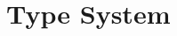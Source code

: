 \documentclass[preprint]{sigplanconf}
\makeatletter
\newcommand{\many}{\overline}
\newcommand\ba{\begin{array}}
\newcommand\ea{\end{array}}
\newcommand{\bstack}{\begin{array}[t]{@{}l@{}}}
\newcommand{\estack}{\end{array}}
\newenvironment{equations}{\[\ba{@{}r@{~}c@{~}l@{}}}{\ea\]}
\newcommand{\effbox}[1]{[#1]}
\newcommand{\var}{\mathit}
\newcommand{\thunk}[1]{\{{#1}\}}
\makeatother
\begin{document}









\section{Type System}
\label{sec:frank}
\end{document}
